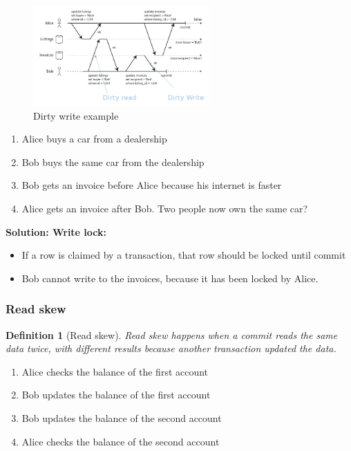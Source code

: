 \documentclass{article}
\newtheorem{theorem}{Definition}[section]
\begin{document}
\begin{figure}[H]
    \centering
    \includegraphics[width=0.6\textwidth]{dirty-reads-lock.png}
    \caption{Dirty write example}
\end{figure}

\begin{enumerate}
    \item Alice buys a car from a dealership
    \item Bob buys the same car from the dealership
    \item Bob gets an invoice before Alice because his internet is faster
    \item Alice gets an invoice after Bob. Two people now own the same car?
\end{enumerate}

\textbf{Solution: Write lock:}

\begin{itemize}
    \item If a row is claimed by a transaction, that row should be locked until commit
    \item Bob cannot write to the invoices, because it has been locked by Alice.
\end{itemize}

\subsubsection{Read skew}

\begin{theorem}[Read skew]
Read skew happens when a commit reads the same data twice, 
with different results because another transaction updated the data.
\end{theorem}

\begin{enumerate}
    \item Alice checks the balance of the first account
    \item Bob updates the balance of the first account
    \item Bob updates the balance of the second account
    \item Alice checks the balance of the second account
\end{enumerate}
\end{document}
